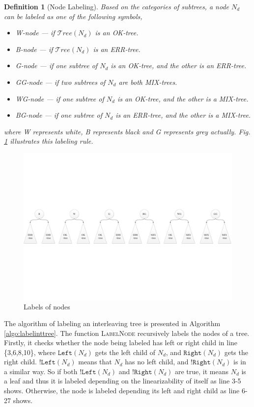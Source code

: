 \documentclass[runningheads]{llncs}
\newtheorem{myDef}{Definition}
\begin{document}
\begin{myDef}[Node Labeling]\label{def:nodelabel}
Based on the categories of subtrees, a node $N_d$ can be labeled as one of the following symbols,
\begin{itemize}
  \item \textit{W}-node --- if $\mathcal{T}ree(N_d)$ is an \textit{OK}-tree.
  \item \textit{B}-node --- if $\mathcal{T}ree(N_d)$ is an \textit{ERR}-tree.
  \item \textit{G}-node --- if one subtree of $N_d$ is an \textit{OK}-tree, and the other is an \textit{ERR}-tree.
  \item \textit{GG}-node --- if two subtrees of $N_d$ are both \textit{MIX}-trees.
  \item \textit{WG}-node --- if one subtree of $N_d$ is an \textit{OK}-tree, and the other is a \textit{MIX}-tree.
  \item \textit{BG}-node --- if one subtree of $N_d$ is an \textit{ERR}-tree, and the other is a \textit{MIX}-tree.
\end{itemize}
\noindent where \textit{W} represents \textit{white}, \textit{B} represents \textit{black} and \textit{G} represents \textit{grey} actually. Fig. \ref{fig:labellabelnodes} illustrates this labeling rule.
\end{myDef}

\vspace{-0.5cm}
\begin{figure}[!ht]
\centering
\includegraphics[width = 4.5in]{label.pdf}
\caption{Labels of nodes}\label{fig:labellabelnodes}
\end{figure}
\vspace{-0.5cm}

The algorithm of labeling an interleaving tree is presented in Algorithm \ref{algo:labelinttree}. The function \textsc{LabelNode} recursively labels the nodes of a tree. Firstly, it checks whether the node being labeled has left or right child in line \{3,6,8,10\}, where $\mathtt{Left}(N_d)$ gets the left child of $N_d$, and $\mathtt{Right}(N_d)$ gets the right child. $!\mathtt{Left}(N_d)$ means that $N_d$ has no left child, and $!\mathtt{Right}(N_d)$ is in a similar way. So if both $!\mathtt{Left}(N_d)$ and $!\mathtt{Right}(N_d)$ are true, it means $N_d$ is a leaf and thus it is labeled depending on the linearizability of itself as line 3-5 shows. Otherwise, the node is labeled depending its left and right child as line 6-27 shows.
\end{document}
